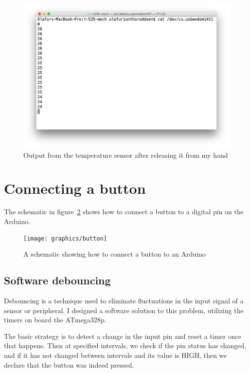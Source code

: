 \documentclass[11pt,a4paper,titlepage]{article}
\begin{document}
	\begin{figure}[H]
		\centering
		\includegraphics[width=\textwidth]{graphics/temp}
		\caption{Output from the temperature sensor after releasing it from my hand}
		\label{fig:temp}
	\end{figure}
	
	\pagebreak
	\section{Connecting a button}
	
	The schematic in figure~\ref{fig:button} shows how to connect a button to a digital pin on the Arduino.
	
	\begin{figure}[H]
			\centering
			\texttt{[image: graphics/button]}
			\caption{A schematic showing how to connect a button to an Arduino}
			\label{fig:button}
	\end{figure}
 	
 	\subsection{Software debouncing\label{sec:debounce}}
 	
 	Debouncing is a technique used to eliminate fluctuations in the input signal of a sensor or peripheral. I designed a software solution to this problem, utilizing the timers on board the ATmega328p.
 	
 	The basic strategy is to detect a change in the input pin and reset a timer once that happens. Then at specified intervals, we check if the pin status has changed, and if it has not changed between intervals and its value is HIGH, then we declare that the button was indeed pressed.
 	
\end{document}
